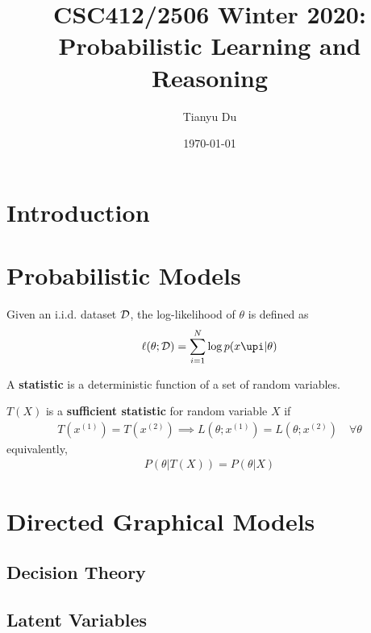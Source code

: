 \documentclass{article}
\title{CSC412/2506 Winter 2020: Probabilistic Learning and Reasoning}
\date{\today}
\author{Tianyu Du}
\begin{document}
    \maketitle
    \tableofcontents
    \newpage
    \section{Introduction}
    
    \section{Probabilistic Models}
	
	\begin{definition}
		Given an i.i.d. dataset $\mathcal{{D}}$, the log-likelihood of $\theta$ is defined as
		\begin{align}
			\ell(\theta;\mc{D}) = \sum_{i=1}^N \log p(x\upi|\theta)
		\end{align}
	\end{definition}
	
	\begin{definition}
		A \textbf{statistic} is a deterministic function of a set of random variables.
	\end{definition}
	
	\begin{definition}
		$T(X)$ is a \textbf{sufficient statistic} for random variable $X$ if
		\begin{align}
			T(x^{(1)}) = T(x^{(2)}) \implies L(\theta; x^{(1)}) = L(\theta; x^{(2)})\quad \forall \theta
		\end{align}
		equivalently,
		\begin{align}
			P(\theta|T(X)) = P(\theta|X)
		\end{align}
	\end{definition}
	
	\section{Directed Graphical Models}
	
	
	
	\subsection{Decision Theory}
	
	\subsection{Latent Variables}
\end{document}

